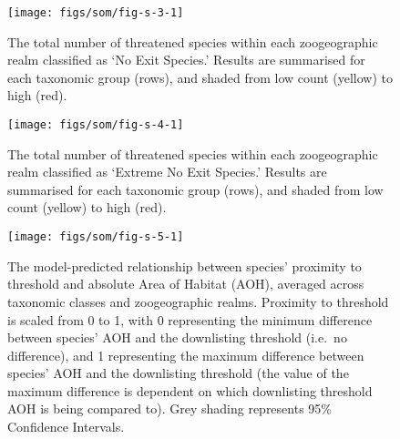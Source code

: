 \documentclass[
  12pt,
  a4paper,
]{article}
\begin{document}
\pagebreak



\begin{figure}

{\centering \texttt{[image: figs/som/fig-s-3-1]} 

}

\caption{The total number of threatened species within each zoogeographic realm classified as `No Exit Species.' Results are summarised for each taxonomic group (rows), and shaded from low count (yellow) to high (red).}\label{fig:fig-s-3}
\end{figure}

\pagebreak



\begin{figure}

{\centering \texttt{[image: figs/som/fig-s-4-1]} 

}

\caption{The total number of threatened species within each zoogeographic realm classified as `Extreme No Exit Species.' Results are summarised for each taxonomic group (rows), and shaded from low count (yellow) to high (red).}\label{fig:fig-s-4}
\end{figure}

\pagebreak



\begin{figure}

{\centering \texttt{[image: figs/som/fig-s-5-1]} 

}

\caption{The model-predicted relationship between species' proximity to threshold and absolute Area of Habitat (AOH), averaged across taxonomic classes and zoogeographic realms. Proximity to threshold is scaled from 0 to 1, with 0 representing the minimum difference between species' AOH and the downlisting threshold (i.e.~no difference), and 1 representing the maximum difference between species' AOH and the downlisting threshold (the value of the maximum difference is dependent on which downlisting threshold AOH is being compared to). Grey shading represents 95\% Confidence Intervals.}\label{fig:fig-s-5}
\end{figure}
\end{document}
